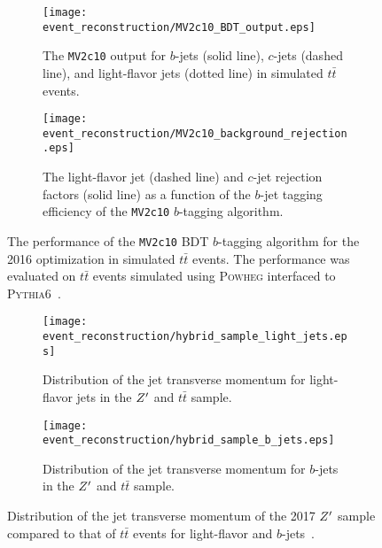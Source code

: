 \begin{figure}[htbp]
 \centering
 \begin{subfigure}[t]{0.48\textwidth}
  \centering
  \texttt{[image: event\_reconstruction/MV2c10\_BDT\_output.eps]}
  \caption[The \texttt{MV2c10} output for $b$-jets, $c$-jets, and light-flavor jets in simulated $t\bar{t}$ events.]{%
   The \texttt{MV2c10} output for $b$-jets (solid line), $c$-jets (dashed line), and light-flavor jets (dotted line) in simulated $t\bar{t}$ events.}
  \label{fig:MV2c10_BDT_output}
 \end{subfigure}%
 \quad
 \begin{subfigure}[t]{0.48\textwidth}
  \centering
  \texttt{[image: event\_reconstruction/MV2c10\_background\_rejection.eps]}
  \caption[The light-flavor jet and $c$-jet rejection factors as a function of the $b$-jet tagging efficiency of the \texttt{MV2c10} $b$-tagging algorithm.]{%
   The light-flavor jet (dashed line) and $c$-jet rejection factors (solid line) as a function of the $b$-jet tagging efficiency of the \texttt{MV2c10} $b$-tagging algorithm.}
  \label{fig:MV2c10_background_rejection}
 \end{subfigure}%
 \caption[The performance of the \texttt{MV2c10} BDT $b$-tagging algorithm for the 2016 optimization in simulated $t\bar{t}$ events.]{%
  The performance of the \texttt{MV2c10} BDT $b$-tagging algorithm for the 2016 optimization in simulated $t\bar{t}$ events.
  The performance was evaluated on $t\bar{t}$ events simulated using \textsc{Powheg} interfaced to \textsc{Pythia6}~\cite{PERF-2016-05}.}
 \label{fig:MV2c10_BDT}
\end{figure}

\begin{figure}[htbp]
 \centering
 \begin{subfigure}[t]{0.48\textwidth}
  \centering
  \texttt{[image: event\_reconstruction/hybrid\_sample\_light\_jets.eps]}
  \caption[Distribution of the jet transverse momentum for light-flavor jets in the $\Zprime$ and $t\bar{t}$ sample.]{%
   Distribution of the jet transverse momentum for light-flavor jets in the $\Zprime$ and $t\bar{t}$ sample.}
  \label{fig:hybrid_sample_light_jets}
 \end{subfigure}%
 \quad
 \begin{subfigure}[t]{0.48\textwidth}
  \centering
  \texttt{[image: event\_reconstruction/hybrid\_sample\_b\_jets.eps]}
  \caption[Distribution of the jet transverse momentum for $b$-jets in the $\Zprime$ and $t\bar{t}$ sample.]{%
   Distribution of the jet transverse momentum for $b$-jets in the $\Zprime$ and $t\bar{t}$ sample.}
  \label{fig:hybrid_sample_b_jets}
 \end{subfigure}%
 \caption[Distribution of the jet transverse momentum of the 2017 $\Zprime$ sample compared to that of $t\bar{t}$ events for light-flavor and $b$-jets.]{%
  Distribution of the jet transverse momentum of the 2017 $\Zprime$ sample compared to that of $t\bar{t}$ events for light-flavor and $b$-jets~\cite{ATL-PHYS-PUB-2017-013}.}
 \label{fig:hybrid_sample_jets}
\end{figure}

